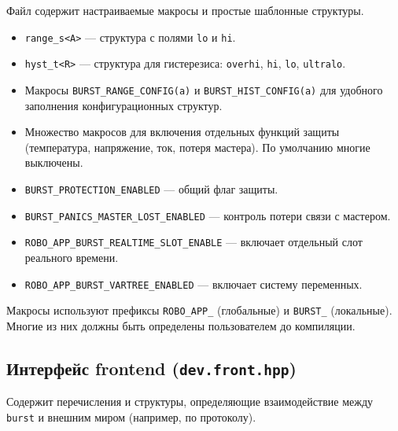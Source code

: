 \documentclass[a4paper,12pt]{article}
\begin{document}
Файл содержит настраиваемые макросы и простые шаблонные структуры.

\begin{itemize}
    \item \texttt{range\_s<A>} — структура с полями \texttt{lo} и \texttt{hi}.
    \item \texttt{hyst\_t<R>} — структура для гистерезиса: \texttt{overhi}, \texttt{hi}, \texttt{lo}, \texttt{ultralo}.
    \item Макросы \texttt{BURST\_RANGE\_CONFIG(a)} и \texttt{BURST\_HIST\_CONFIG(a)} для удобного заполнения конфигурационных структур.
    \item Множество макросов для включения отдельных функций защиты (температура, напряжение, ток, потеря мастера). По умолчанию многие выключены.
    \item \texttt{BURST\_PROTECTION\_ENABLED} — общий флаг защиты.
    \item \texttt{BURST\_PANICS\_MASTER\_LOST\_ENABLED} — контроль потери связи с мастером.
    \item \texttt{ROBO\_APP\_BURST\_REALTIME\_SLOT\_ENABLE} — включает отдельный слот реального времени.
    \item \texttt{ROBO\_APP\_BURST\_VARTREE\_ENABLED} — включает систему переменных.
\end{itemize}

Макросы используют префиксы \texttt{ROBO\_APP\_} (глобальные) и \texttt{BURST\_} (локальные). Многие из них должны быть определены пользователем до компиляции.

\subsection{Интерфейс frontend (\texttt{dev.front.hpp})}

Содержит перечисления и структуры, определяющие взаимодействие между \texttt{burst} и внешним миром (например, по протоколу).
\end{document}
